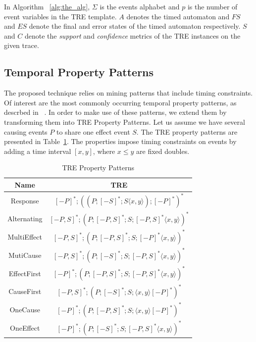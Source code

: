 \documentclass[]{sigplanconf}
\begin{document}
In Algorithm ~\ref{alg:the_alg}, $\Sigma$ is the events alphabet and $p$ is the number of event variables in the TRE template. $A$ denotes the timed automaton and $FS$ and $ES$ denote the final and error states of the timed automaton respectively. $S$ and $C$ denote the \emph{support} and \emph{confidence} metrics of the TRE instances on the given trace.

\subsection{Temporal Property Patterns}

The proposed technique relies on mining patterns that include timing constraints. Of interest are the most commonly occurring temporal property patterns, as descrbed in ~\cite{evans1}. In order to make use of these patterns, we extend them by transforming them into TRE Property Patterns. Let us assume we have several causing events $P$ to share one effect event $S$. The TRE property patterns are presented in Table~\ref{TRE_Exp}. The properties impose timing constraints on events by adding a time interval $[x, y]$, where $x \le y$ are fixed doubles.

\begin{table}[ht]
  \centering
  \begin{tabular}{|c|c|}
  \hline
  \textbf{Name} & \textbf{TRE}  \\ \hline
  Response      & $[-P]^*;((P;[-S]^*;S \langle x,y \rangle);[-P]^*)^*$        \\ \hline
  Alternating   & $[-P,S]^*;(P;[-P,S]^*;S;[-P,S]^* \langle x,y \rangle)^*$       \\ \hline
  MultiEffect   &  $[-P,S]^*;(P;[-P,S]^*;S;[-P]^* \langle x,y \rangle)^*$     \\ \hline
  MutiCause     &  $[-P,S]^*;(P;[-S]^*;S;[-P,S]^* \langle x,y \rangle)^*$     \\ \hline
  EffectFirst   &  $[-P]^*;(P;[-P,S]^*;S;[-P,S]^* \langle x,y \rangle)^*$      \\ \hline
  CauseFirst    &  $[-P,S]^*;(P;[-S]^*;S;\langle x,y \rangle [-P]^*)^*$       \\ \hline
  OneCause      &  $[-P]^*;(P;[-P,S]^*;S;\langle x,y \rangle [-P]^*)^*$       \\ \hline
  OneEffect     &  $[-P]^*;(P;[-S]^*;S;[-P,S]^* \langle x,y \rangle)^*$       \\ \hline
\end{tabular}
\caption{TRE Property Patterns}\label{TRE_Exp}
\end{table}
\end{document}

